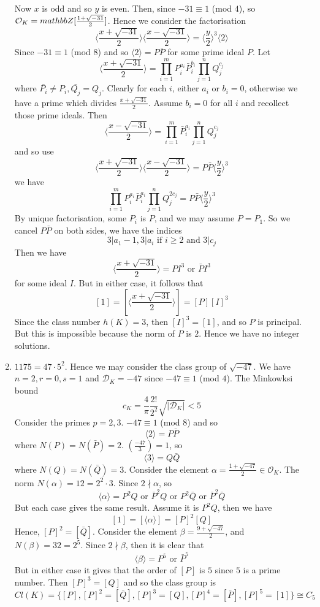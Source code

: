 \begin{enumerate}
Now $x$ is odd and so $y$ is even. Then, since $-31 \equiv 1$ (mod $4$), so
$\mathcal{O}_K=\\mathbb{Z}[\frac{1+\sqrt{-31}}{2}]$.
Hence we consider the factorisation
$$\langle \frac{x+\sqrt{-31}}{2} \rangle \langle \frac{x-\sqrt{-31}}{2} \rangle=\langle \frac{y}{2} \rangle^3
\langle 2 \rangle$$
Since $-31 \equiv 1$ (mod $8$) and so $\langle 2 \rangle=P\bar{P}$ for some prime ideal $P$.
Let
$$\langle \frac{x+\sqrt{-31}}{2} \rangle=\prod_{i=1}^m P^{a_i}_i\bar{P}^{b_i}_i \prod_{j=1}^n Q^{c_j}_j$$
where $\bar{P_i} \neq P_i, \bar{Q_j}=Q_j$. Clearly for each $i$, either $a_i$ or $b_i=0$, otherwise we have a
prime which divides $\frac{x+\sqrt{-31}}{2}$. Assume $b_i=0$ for all $i$ and recollect those prime ideals.
Then
$$\langle \frac{x-\sqrt{-31}}{2} \rangle=\prod_{i=1}^m \bar{P}^{a_i}_i \prod_{j=1}^n Q^{c_j}_j$$
and so use
$$\langle \frac{x+\sqrt{-31}}{2} \rangle \langle \frac{x-\sqrt{-31}}{2} \rangle =P\bar{P}\langle \frac{y}{2}\rangle^3$$
we have
$$\prod_{i=1}^m P^{a_i}_i \bar{P}^{a_i}_i \prod_{j=1}^n Q^{2c_j}_j=P\bar{P} \langle \frac{y}{2}\rangle^3$$
By unique factorisation, some $P_i$ is $P$, and we may assume $P=P_1$. So we cancel $P\bar{P}$ on both sides,
we have the indices
$$3|a_1-1, 3|a_i \text{ if } i \ge 2 \text{ and } 3|c_j$$
Then we have
$$\langle \frac{x+\sqrt{-31}}{2} \rangle=P I^3 \text{ or } \bar{P} I^3$$
for some ideal $I$. But in either case, it follows that
$$[1]=[\langle \frac{x+\sqrt{-31}}{2} \rangle]=[P] [I]^3$$
Since the class number $h(K)=3$, then $[I]^3=[1]$, and so $P$ is principal. But
this is impossible because the norm of $P$ is $2$. Hence we have no integer solutions.
\item $1175=47 \cdot 5^2$. Hence we may consider the class group of $\sqrt{-47}$. We have
$n=2,r=0,s=1$ and $\mathcal{D}_K=-47$ since $-47 \equiv 1$ (mod $4$).
The Minkowksi bound
$$c_K=\frac{4}{\pi} \frac{2!}{2^2} \sqrt{|\mathcal{D}_K|}<5$$
Consider the primes $p=2,3$. $-47 \equiv 1$ (mod $8$) and so
$$\langle 2 \rangle=P\bar{P}$$ where $N(P)=N(\bar{P})=2$.
$(\frac{-47}{3})=1$, so
$$\langle 3 \rangle=Q\bar{Q}$$ where $N(Q)=N(\bar{Q})=3$.
Consider the element $\alpha=\frac{1+\sqrt{-47}}{2} \in \mathcal{O}_K$. The norm
$N(\alpha)=12=2^2 \cdot 3$. Since $2 \nmid \alpha$, so
$$\langle \alpha \rangle=P^2Q \text{ or } \bar{P}^2Q \text{ or }P^2\bar{Q} \text{ or }\bar{P}^2\bar{Q}$$
But each case gives the same result. Assume it is $P^2Q$, then we have
$$[1]=[\langle \alpha \rangle]=[P]^2[Q]$$
Hence, $[P]^2=[\bar{Q}]$.
Consider the element $\beta=\frac{9+\sqrt{-47}}{2}$, and $N(\beta)=32=2^5$.
Since $2 \nmid \beta$, then it is clear that
$$\langle \beta \rangle=P^5 \text{ or } \bar{P}^5$$
But in either case it gives that the order of $[P]$ is $5$ since $5$ is a prime number.
Then $[P]^3=[Q]$ and so the class group is
$$Cl(K)=\{[P],[P]^2=[\bar{Q}],[P]^3=[Q],[P]^4=[\bar{P}],[P]^5=[1]\} \cong C_5$$


\end{enumerate}
